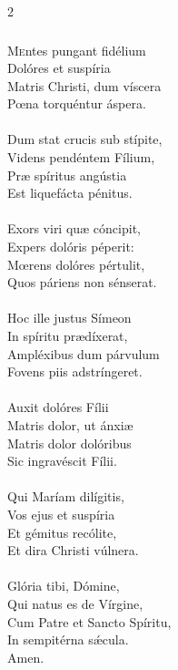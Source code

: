 \documentclass[9pt,twoside]{extarticle}
\begin{document}
\begin{multicols}{2}
\subsubsection*{\center {}}
\lettrine{M}entes pungant fidélium\\
Dolóres et suspíria\\
Matris Christi, dum víscera\\
Pœna torquéntur áspera.\\
\\
Dum stat crucis sub stípite,\\
Videns pendéntem Fílium,\\
Præ spíritus angústia\\
Est liquefácta pénitus.\\
\\
Exors viri quæ cóncipit,\\
Expers dolóris péperit:\\
Mœrens dolóres pértulit,\\
Quos páriens non sénserat.\\
\\
Hoc ille justus Símeon\\
In spíritu prædíxerat,\\
Ampléxibus dum párvulum\\
Fovens piis adstríngeret.\\
\\
Auxit dolóres Fílii\\
Matris dolor, ut ánxiæ\\
Matris dolor dolóribus\\
Sic ingravéscit Fílii.\\
\\
Qui Maríam dilígitis,\\
Vos ejus et suspíria\\
Et gémitus recólite,\\
Et dira Christi vúlnera.\\
\\
Glória tibi, Dómine,\\
Qui natus es de Vírgine,\\
Cum Patre et Sancto Spíritu,\\
In sempitérna sǽcula.\\
Amen.


\end{multicols}
\end{document}
